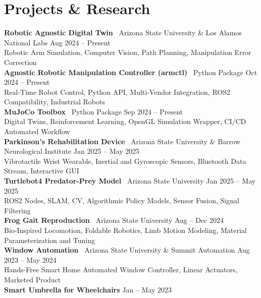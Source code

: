 \documentclass[10pt]{article}
\begin{document}
\section*{Projects \& Research}
\textbf{Robotic Agnostic Digital Twin} \textbar\ Arizona State University \& Los Alamos National Labs  \hfill Aug 2024 -- Present \\
\hspace*{2em}Robotic Arm Simulation, Computer Vision, Path Planning, Manipulation Error Correction
\\
\textbf{Agnostic Robotic Manipulation Controller (armctl)} \textbar\ Python Package \hfill Oct 2024 -- Present \\
\hspace*{2em}Real-Time Robot Control, Python API, Multi-Vendor Integration, ROS2 Compatibility, Industrial Robots
\\
\textbf{MuJoCo Toolbox} \textbar\ Python Package \hfill Sep 2024 -- Present \\
\hspace*{2em}Digital Twins, Reinforcement Learning, OpenGL Simulation Wrapper, CI/CD Automated Workflow
\\
\textbf{Parkinson's Rehabilitation Device} \textbar\ Arizona State University \& Barrow Neurological Institute \hfill Jan 2025 -- May 2025 \\
\hspace*{2em}Vibrotactile Wrist Wearable, Inertial and Gyroscopic Sensors, Bluetooth Data Stream, Interactive GUI
\\
\textbf{Turtlebot4 Predator-Prey Model} \textbar\ Arizona State University \hfill Jan 2025 -- May 2025 \\
\hspace*{2em}ROS2 Nodes, SLAM, CV, Algorithmic Policy Models, Sensor Fusion, Signal Filtering
\\
\textbf{Frog Gait Reproduction} \textbar\ Arizona State University \hfill Aug -- Dec 2024 \\
\hspace*{2em}Bio-Inspired Locomotion, Foldable Robotics, Limb Motion Modeling, Material Parameterization and Tuning
\\
\textbf{Window Automation} \textbar\ Arizona State University \& Summit Automation \hfill Aug 2023 -- May 2024 \\
\hspace*{2em}Hands-Free Smart Home Automated Window Controller, Linear Actuators, Marketed Product
\\
\textbf{Smart Umbrella for Wheelchairs} \hfill Jan -- May 2023 \\
\end{document}
